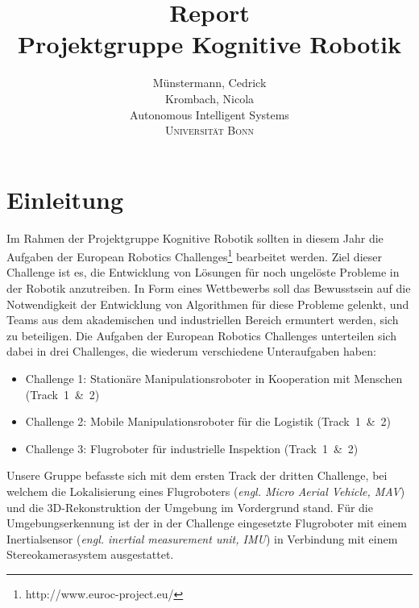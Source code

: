\documentclass[12pt,titlepage, a4paper]{article}
\begin{document}
\title{Report\vspace{1cm}\\\textbf{Projektgruppe Kognitive Robotik}\vspace{5cm}}


\author{Münstermann,  Cedrick\\  Krombach, Nicola\\[1cm]
	Autonomous Intelligent Systems\\ \textsc{Universität Bonn}\\}



\maketitle



\section{Einleitung}

Im Rahmen der Projektgruppe Kognitive Robotik sollten in diesem Jahr die Aufgaben der European Robotics Challenges\footnote{http://www.euroc-project.eu/} bearbeitet werden.
Ziel dieser Challenge ist es, die Entwicklung von Lösungen für noch ungelöste Probleme in der Robotik anzutreiben.
In Form eines Wettbewerbs soll das Bewusstsein auf die Notwendigkeit der Entwicklung von Algorithmen für diese Probleme gelenkt, und Teams aus dem 
akademischen und industriellen Bereich ermuntert werden, sich zu beteiligen.
Die Aufgaben der European Robotics Challenges unterteilen sich dabei in drei Challenges, die wiederum verschiedene Unteraufgaben haben:

\begin{itemize}
 \item Challenge 1: Stationäre Manipulationsroboter in Kooperation mit Menschen \mbox{(Track 1 \& 2)}
 \item Challenge 2: Mobile Manipulationsroboter für die Logistik \mbox{(Track 1 \& 2)}
 \item Challenge 3: Flugroboter für industrielle Inspektion \mbox{(Track 1 \& 2)}
\end{itemize}

Unsere Gruppe befasste sich mit dem ersten Track der dritten Challenge, bei welchem die Lokalisierung eines Flugroboters (\textit{engl. Micro Aerial Vehicle, MAV}) und die 3D-Rekonstruktion 
der Umgebung im Vordergrund stand.
Für die Umgebungserkennung ist der in der Challenge eingesetzte Flugroboter mit einem Inertialsensor (\textit{engl. inertial measurement unit, IMU}) in Verbindung mit einem Stereokamerasystem ausgestattet. 
\end{document}
